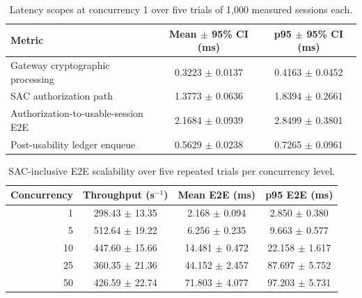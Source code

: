 
\begin{table}[t]
\centering
\caption{Latency scopes at concurrency 1 over five trials of 1,000 measured sessions each.}
\label{tab:docker-latency-scopes}
\begin{tabular}{lcc}
\hline
\textbf{Metric} & \textbf{Mean $\pm$ 95\% CI (ms)} & \textbf{p95 $\pm$ 95\% CI (ms)} \\
\hline
Gateway cryptographic processing & 0.3223 $\pm$ 0.0137 & 0.4163 $\pm$ 0.0452 \\
SAC authorization path & 1.3773 $\pm$ 0.0636 & 1.8394 $\pm$ 0.2661 \\
Authorization-to-usable-session E2E & 2.1684 $\pm$ 0.0939 & 2.8499 $\pm$ 0.3801 \\
Post-usability ledger enqueue & 0.5629 $\pm$ 0.0238 & 0.7265 $\pm$ 0.0961 \\
\hline
\end{tabular}
\end{table}

\begin{table}[t]
\centering
\caption{SAC-inclusive E2E scalability over five repeated trials per concurrency level.}
\label{tab:docker-e2e-scalability}
\begin{tabular}{rccc}
\hline
\textbf{Concurrency} & \textbf{Throughput (s$^{-1}$)} & \textbf{Mean E2E (ms)} & \textbf{p95 E2E (ms)} \\
\hline
1 & 298.43 $\pm$ 13.35 & 2.168 $\pm$ 0.094 & 2.850 $\pm$ 0.380 \\
5 & 512.64 $\pm$ 19.22 & 6.256 $\pm$ 0.235 & 9.663 $\pm$ 0.577 \\
10 & 447.60 $\pm$ 15.66 & 14.481 $\pm$ 0.472 & 22.158 $\pm$ 1.617 \\
25 & 360.35 $\pm$ 21.36 & 44.152 $\pm$ 2.457 & 87.697 $\pm$ 5.752 \\
50 & 426.59 $\pm$ 22.74 & 71.803 $\pm$ 4.077 & 97.203 $\pm$ 5.731 \\
\hline
\end{tabular}
\end{table}

